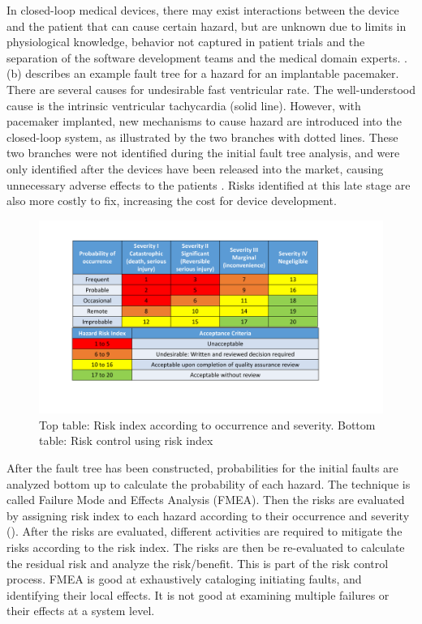 In closed-loop medical devices, there may exist interactions between the device and the patient that can cause certain hazard, but are unknown due to limits in physiological knowledge, behavior not captured in patient trials and the separation of the software development teams and the medical domain experts. .(b) describes an example fault tree for a hazard for an implantable pacemaker. There are several causes for undesirable fast ventricular rate. The well-understood cause is the intrinsic ventricular tachycardia (solid line). However, with pacemaker implanted, new mechanisms to cause hazard are introduced into the closed-loop system, as illustrated by the two branches with dotted lines. These two branches were not identified during the initial fault tree analysis, and were only identified after the devices have been released into the market, causing unnecessary adverse effects to the patients \cite{ELT}. Risks identified at this late stage are also more costly to fix, increasing the cost for device development. 


\begin{figure}[t]
		\centering
		\includegraphics[width=\textwidth]{figs/risk_analysis.pdf}
		\caption{Top table: Risk index according to occurrence and severity. Bottom table: Risk control using risk index}
		\label{fig:risk_ana}
\end{figure}

After the fault tree has been constructed, probabilities for the initial faults are analyzed bottom up to calculate the probability of each hazard. The technique is called Failure Mode and Effects Analysis (FMEA). Then the risks are evaluated by assigning risk index to each hazard according to their occurrence and severity (). After the risks are evaluated, different activities are required to mitigate the risks according to the risk index. The risks are then be re-evaluated to calculate the residual risk and analyze the risk/benefit. This is part of the risk control process. FMEA is good at exhaustively cataloging initiating faults, and identifying their local effects. It is not good at examining multiple failures or their effects at a system level.

